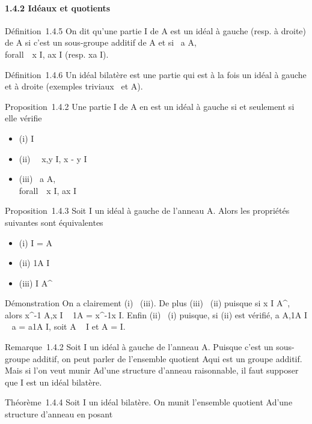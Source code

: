 \paragraph{1.4.2 Idéaux et quotients}

Définition~1.4.5 On dit qu'une partie I de A est un idéal à gauche
(resp. à droite) de A si c'est un sous-groupe additif de A et si
\forall~a \in A,\\forall~~x \in I, ax \in
I (resp. xa \in I).

Définition~1.4.6 Un idéal bilatère est une partie qui est à la fois un
idéal à gauche et à droite (exemples triviaux
\0\ et A).

Proposition~1.4.2 Une partie I de A en est un idéal à gauche si et
seulement si elle vérifie

\begin{itemize}
\itemsep1pt\parskip0pt
\item
  (i) I\neq~\varnothing~
\item
  (ii) \forall~~x,y \in I, x - y \in I
\item
  (iii) \forall~a \in A,\\forall~~x \in
  I, ax \in I
\end{itemize}

Proposition~1.4.3 Soit I un idéal à gauche de l'anneau A. Alors les
propriétés suivantes sont équivalentes

\begin{itemize}
\itemsep1pt\parskip0pt
\item
  (i) I = A
\item
  (ii) 1A \in I
\item
  (iii) I \bigcap A^\times\neq~\varnothing~
\end{itemize}

Démonstration On a clairement (i) \rigtharrow~(iii). De plus (iii) \rigtharrow~(ii) puisque si
x \in I \bigcap A^\times, alors x^-1 \in A,x \in I \rigtharrow~ 1A =
x^-1x \in I. Enfin (ii) \rigtharrow~(i) puisque, si (ii) est vérifié, a \in
A,1A \in I \rigtharrow~ a = a1A \in I, soit A \subset~ I et A = I.

Remarque~1.4.2 Soit I un idéal à gauche de l'anneau A. Puisque c'est un
sous-groupe additif, on peut parler de l'ensemble quotient A\diagupI qui est
un groupe additif. Mais si l'on veut munir A\diagupI d'une structure d'anneau
raisonnable, il faut supposer que I est un idéal bilatère.

Théorème~1.4.4 Soit I un idéal bilatère. On munit l'ensemble quotient
A\diagupI d'une structure d'anneau en posant

